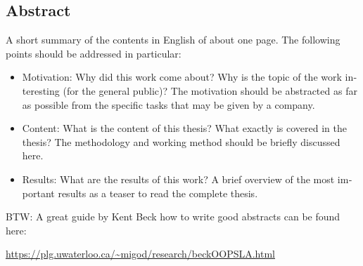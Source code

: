 

\begin{otherlanguage}{american}
	\chapter*{Abstract}
	A short summary of the contents in English of about one page. The following points should be addressed in particular:
	\begin{itemize}
		\item Motivation: Why did this work come about? Why is the topic of the work interesting (for the general public)? The motivation should be abstracted as far as possible from the specific tasks that may be given by a company.
		\item Content: What is the content of this thesis? What exactly is covered in the thesis? The methodology and working method should be briefly discussed here.
		\item Results: What are the results of this work? A brief overview of the most important results as a teaser to read the complete thesis.
	\end{itemize}
	\medskip

	\noindent
	BTW: A great guide by Kent Beck how to write good abstracts can be found here:
	\begin{center}
		\url{https://plg.uwaterloo.ca/~migod/research/beckOOPSLA.html}
	\end{center}
\end{otherlanguage}
